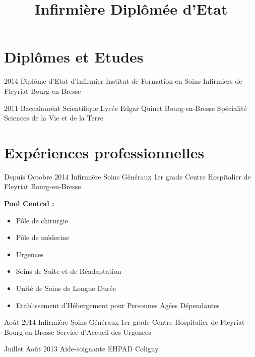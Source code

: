 \documentclass[10pt,a4paper]{moderncv}
\title{Infirmière Diplômée d'Etat}
\begin{document}
\maketitle
\pagestyle{empty}


\section{Diplômes et Etudes}

\cventry
	{2014}
	{Diplôme d'Etat d'Infirmier}
	{Institut de Formation en Soins Infirmiers de Fleyriat}
	{Bourg-en-Bresse}
	{}
	{}

\cventry
	{2011}
	{Baccalauréat Scientifique}
	{Lycée Edgar Quinet}
	{Bourg-en-Bresse}
	{}
	{Spécialité Sciences de la Vie et de la Terre}



\section{Expériences professionnelles}

\cventry
	{Depuis Octobre 2014}
	{Infirmière Soins Généraux 1er grade}
	{Centre Hospitalier de Fleyriat}
	{Bourg-en-Bresse}
	{}
	{\textbf{Pool Central :}
		\begin{itemize}
			\item Pôle de chirurgie
			\item Pôle de médecine
			\item Urgences
			\item Soins de Suite et de Réadaptation
			\item Unité de Soins de Longue Durée
			\item Etablissement d'Hébergement pour Personnes Agées Dépendantes
		\end{itemize}
	}

\vspace*{3mm}

\cventry
	{Août 2014}
	{Infirmière Soins Généraux 1er grade}
	{Centre Hospitalier de Fleyriat}
	{Bourg-en-Bresse}
	{}
	{Service d'Accueil des Urgences}

\cventry
	{Juillet Août 2013}
	{Aide-soignante}
	{EHPAD}
	{Coligny}
	{}
	{}
\end{document}
